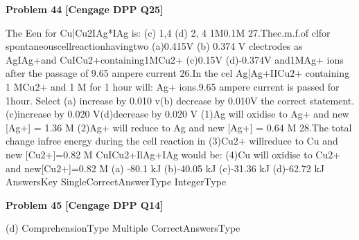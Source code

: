 \begin{problembox}
\textbf{Problem 44} \hfill \textbf{[Cengage DPP Q25]}
\label{q:ext-cng_dpp_all_questions-44}

The Een for Cu|Cu2IAg*IAg is:
(c) 1,4
(d) 2, 4
1M0.1M
27.Thec.m.f.of clfor spontaneouscellreactionhavingtwo
(a)0.415V
(b) 0.374 V
clectrodes as AgIAg+and CuICu2+containing1MCu2+
(c)0.15V
(d)-0.374V
and1MAg+ ions after the passage of 9.65 ampere current
26.In the cel Ag|Ag+IICu$2$+ containing 1 MCu2+ and 1 M
for 1 hour will:
Ag+ ions.9.65 ampere current is passed for 1hour. Select
(a) increase by 0.010 v(b) decrease by 0.010V
the correct statement.
(c)increase by 0.020 V(d)decrease by 0.020 V
(1)Ag will oxidise to Ag+ and new [Ag+] = 1.36 M
(2)Ag+ will reduce to Ag and new [Ag+] = 0.64 M
28.The total change infree energy during the cell reaction in
(3)Cu$2$+ willreduce to Cu and new [Cu$2$+]=0.82 M
CuICu2+IlAg+IAg would be:
(4)Cu will oxidise to Cu2+ and new[Cu$2$+]=0.82 M
(a) -80.1 kJ
(b)-40.05 kJ
(c)-31.36 kJ
(d)-62.72 kJ
AnswersKey
SingleCorrectAnswerType
IntegerType
\end{problembox}

\begin{problembox}
\textbf{Problem 45} \hfill \textbf{[Cengage DPP Q14]}
\label{q:ext-cng_dpp_all_questions-45}

(d)
ComprehensionType
Multiple CorrectAnswersType
\end{problembox}

